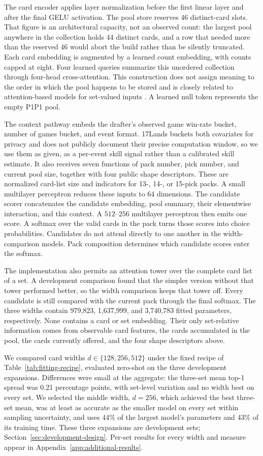 \documentclass[11pt]{article}
\numberwithin{equation}{section}
\begin{document}
The card encoder applies layer normalization before the first linear layer and
after the final GELU activation. The pool store reserves 46 distinct-card slots.
That figure is an architectural capacity, not an observed count: the largest
pool anywhere in the collection holds 44 distinct cards, and a row that needed
more than the reserved 46 would abort the build rather than be silently
truncated. Each card embedding is augmented by a learned count embedding, with counts
capped at eight. Four learned queries summarize this unordered collection
through four-head cross-attention. This construction does not assign meaning
to the order in which the pool happens to be stored and is closely related to
attention-based models for set-valued inputs \citep{lee2019}. A learned null token
represents the empty P1P1 pool.

The context pathway embeds the drafter's observed game win-rate bucket, number
of games bucket, and event format. 17Lands buckets both covariates for privacy
and does not publicly document their precise computation window, so we use them
as given, as a per-event skill signal rather than a calibrated skill estimate. It also receives seven functions of pack
number, pick number, and current pool size, together with four public shape
descriptors. These are normalized card-list size and indicators for 13-, 14-,
or 15-pick packs. A small multilayer perceptron reduces these inputs to 64 dimensions. The
candidate scorer concatenates the candidate embedding, pool summary, their
elementwise interaction, and this context. A $512$--$256$ multilayer perceptron
then emits one score. A softmax over the valid cards in the pack turns those
scores into choice probabilities. Candidates do not attend directly to one
another in the width-comparison models. Pack composition determines which candidate
scores enter the softmax.

The implementation also permits an attention tower over the complete card list
of a set. A development comparison found that the simpler version without that
tower performed better, so the width comparison keeps that tower off. Every
candidate is still compared with the current pack through the final softmax.
The three widths contain 979,823, 1,637,999, and 3,740,783 fitted parameters,
respectively. None contains a card or set embedding. Their only set-relative
information comes from observable card features, the cards accumulated in the
pool, the cards currently offered, and the four shape descriptors above.

We compared card widths $d\in\{128,256,512\}$ under the fixed recipe of
Table~\ref{tab:fitting-recipe}, evaluated zero-shot on the three development
expansions. Differences were small at the aggregate: the three-set mean top-1
spread was 0.21 percentage points, with set-level variation and no width best on
every set. We selected the middle width, $d=256$, which achieved the best
three-set mean, was at least as accurate as the smaller model on every set
within sampling uncertainty, and uses 44\% of the largest model's parameters and
43\% of its training time. These three expansions are development sets;
Section~\ref{sec:development-design}.
Per-set results for every width and measure appear in
Appendix~\ref{app:additional-results}.
\end{document}

